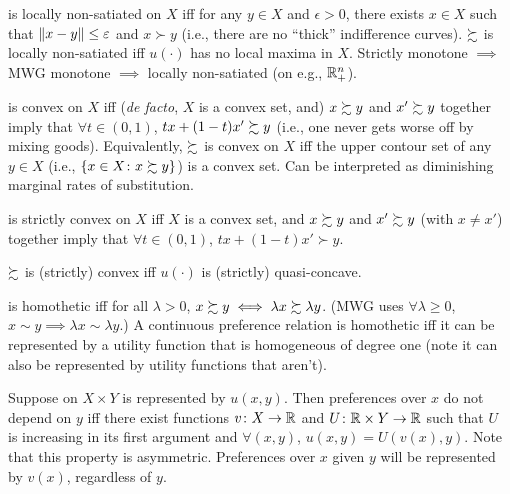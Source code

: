 \documentclass[8pt,letterpaper, landscape]{extarticle} %
\begin{document}
\begin{multicols}{3}
\begin{description}
 \pref{} is locally non-satiated on $ X $ iff for any $ y \in X $ and $ \epsilon > 0 $, there exists $ x \in X $ such that $ \lVert x - y\rVert \leq \varepsilon $ and $ x \succ y $ (i.e., there are no ``thick'' indifference curves). $ \succsim $ is locally non-satiated iff $ u (\cdot) $ has no local maxima in $ X $. Strictly monotone $ \implies $ MWG monotone $ \implies $ locally non-satiated (on e.g., $\mathbb{R}^n_+$).

 \pref{} is convex on $ X $ iff (\textit{de facto}, $ X $ is a convex set, and) $ x \succsim y $ and $ x' \succsim y $ together imply that $ \forall t \in (0,1) $, $ tx + (1-t)x' \succsim y $ (i.e., one never gets worse off by mixing goods). Equivalently, $ \succsim $ is convex on $ X $ iff the upper contour set of any $ y \in X $ (i.e., $ \{ x \in X \colon x \succsim y \} $) is a convex set. Can be interpreted as diminishing marginal rates of substitution.

\pref{} is strictly convex on $ X $ iff $ X $ is a convex set, and $ x \succsim y $ and $ x' \succsim y $ (with $ x \neq x' $) together imply that $ \forall t \in (0,1) $, $ tx + (1-t)x' \succ y $.

$ \succsim $ is (strictly) convex iff $ u ( \cdot) $ is (strictly) quasi-concave.

 \pref{} is homothetic iff for all $ \lambda > 0 $, $ x \succsim y \iff \lambda x \succsim \lambda y $. (MWG uses $ \forall \lambda \geq 0 $, $ x \sim y \implies \lambda x \sim \lambda y $.) A continuous preference relation is homothetic iff it can be represented by a utility function that is homogeneous of degree one (note it can also be represented by utility functions that aren't).

 Suppose \pref{} on $ X \times Y $ is represented by $ u(x,y) $. Then preferences over $ x $ do not depend on $ y $ iff there exist functions $ v \colon X \to \mathbb{R} $ and $ U \colon \mathbb{R} \times Y \to \mathbb{R} $ such that $ U $ is increasing in its first argument and $ \forall (x,y) $, $ u(x,y) = U(v(x),y) $. Note that this property is asymmetric. Preferences over $ x $ given $ y $ will be represented by $ v(x) $, regardless of $ y $.


\end{description}
\end{multicols}
\end{document}
